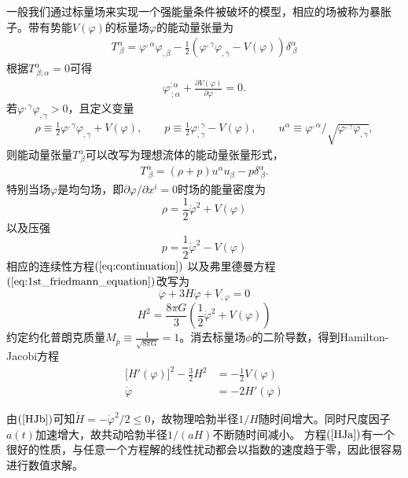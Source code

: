 一般我们通过标量场来实现一个强能量条件被破坏的模型，相应的场被称为暴胀子。带有势能$V(\varphi)$的标量场$\varphi$的能动量张量为
\begin{align}
  \label{eq:scalar-energy-momentum-tensor}
  T^{\alpha}_{\ \beta} = \varphi^{,\alpha}\varphi_{,\beta}-
  \frac{1}{2}{\left(\varphi^{,\gamma}\varphi_{,\gamma}-V(\varphi)\right)}\delta^{\alpha}_{\ \beta}
\end{align}
根据$T^{\alpha}_{\ \beta;\alpha}=0$可得
\begin{align}
  \varphi^{;\alpha}_{\ ;\alpha}+\frac{\partial V(\varphi)}{\partial\varphi}
  =0.
\end{align}
若$\varphi^{,\gamma}\varphi_{,\gamma}>0$，且定义变量
\begin{align}
  \rho \equiv
  \frac{1}{2}\varphi^{,\gamma}\varphi_{,\gamma}+V(\varphi),\qquad 
  p\equiv \frac{1}{2}\varphi^{,\gamma}_{,\gamma}-V(\varphi),\qquad
  u^{\alpha}\equiv \varphi^{,\alpha}/
  \sqrt{\varphi^{,\gamma}\varphi_{,\gamma}},
\end{align}
则能动量张量$T^{\alpha}_{\
\beta}$可以改写为理想流体的能动量张量形式，
\begin{align}
  \label{eq:perfect-fluid-energy-momentum-tensor}
  T^{\alpha}_{\ \beta}=(\rho+p)u^{\alpha}u_{\beta}-p\delta^{\alpha}_{\
  \beta}.
\end{align}
特别当场$\varphi$是均匀场，即$\partial\varphi /\partial x^{i}=0$时场的能量密度为
\begin{equation}\label{eq:energy_density}
  \rho = \frac{1}{2}\dot{\varphi}^2+V(\varphi)
\end{equation}
以及压强
\begin{equation}\label{eq:pressure}
  p=\frac{1}{2}\dot{\varphi}^2-V(\varphi)
\end{equation}
相应的连续性方程$(\ref{eq:continuation})$
以及弗里德曼方程$(\ref{eq:1st_friedmann_equation})$改写为
\begin{equation}
  \ddot{\varphi}+3H\dot\varphi+V_{,\varphi}=0
\end{equation}
\begin{equation}
  H^2=\frac{8\pi G}{3}\left(\frac{1}{2}\dot\varphi^2+V(\varphi)\right)
\end{equation}
约定约化普朗克质量$M_p\equiv\frac{1}{\sqrt{8\pi G}}=1$。消去标量场$\phi$的二阶导数，得到Hamilton-Jacobi方程
\begin{align}
  \lbrack H'(\varphi)\rbrack^2 - \frac{3}{2}H^2 &=
  -\frac{1}{2}V(\varphi)\label{HJa} \\
  \dot\varphi  &= -2H'(\varphi)\label{HJb}
\end{align}

由$(\ref{HJb})$可知$\dot H=-\dot \varphi^2/2\leq 0$，故物理哈勃半径$1/H$随时间增大。同时尺度因子$a(t)$加速增大，故共动哈勃半径$1/(aH)$不断随时间减小。
方程$(\ref{HJa})$有一个很好的性质，与任意一个方程解的线性扰动都会以指数的速度趋于零，因此很容易进行数值求解。
